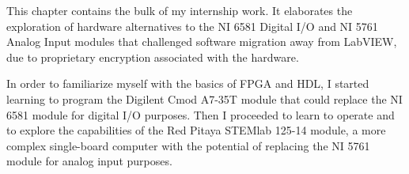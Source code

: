 This chapter contains the bulk of my internship work. It elaborates the exploration of hardware alternatives to the NI 6581 Digital I/O and NI 5761 Analog Input modules that challenged software migration away from LabVIEW, due to proprietary encryption associated with the hardware.

In order to familiarize myself with the basics of FPGA and HDL, I started learning to program the Digilent Cmod A7-35T module that could replace the NI 6581 module for digital I/O purposes. Then I proceeded to learn to operate and to explore the capabilities of the Red Pitaya STEMlab 125-14 module, a more complex single-board computer with the potential of replacing the NI 5761 module for analog input purposes.